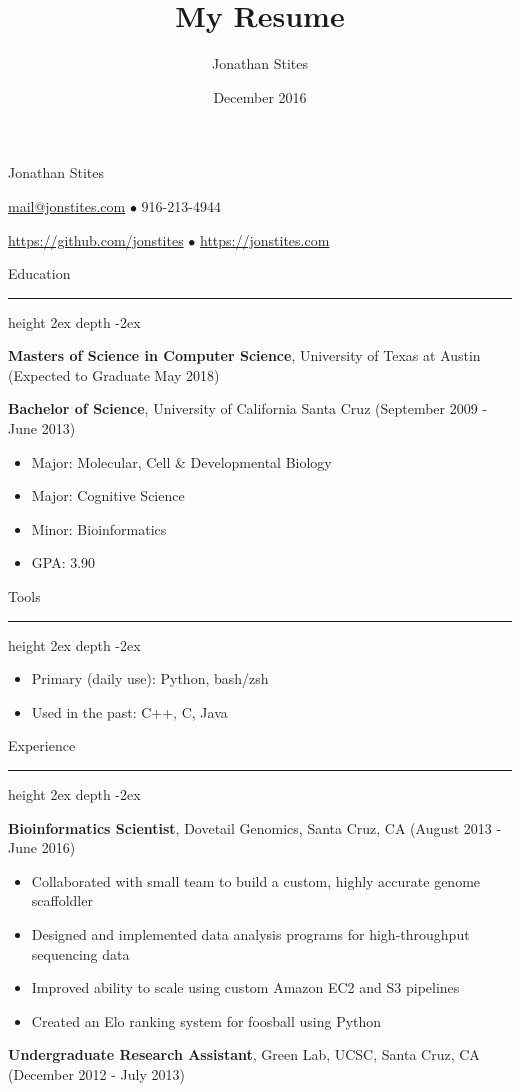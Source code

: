 \documentclass[10pt]{article}
\title{My Resume}
\author{Jonathan Stites}
\date{December 2016}
\newcommand\sectionline{\par\leavevmode\leaders\hrule height 2ex depth \dimexpr0.4pt-2ex\hfill\kern0pt\par}
\begin{document}
\begin{center}
{\LARGE Jonathan Stites}

{\href{mailto:mail+resume@jonstites.com}{mail@jonstites.com}}
$\bullet$
916-213-4944

{\href{https://github.com/jonstites}{https://github.com/jonstites}}
$\bullet$
{\href{https://jonstites.com}{https://jonstites.com}}
\end{center}

{\Large Education}\sectionline

\textbf{Masters of Science in Computer Science}, University of Texas at Austin (Expected to Graduate May 2018)

\vspace{\baselineskip}

\textbf{Bachelor of Science}, University of California Santa Cruz (September 2009 - June 2013)

\begin{itemize}
\item Major: Molecular, Cell \& Developmental Biology
\item Major: Cognitive Science
\item Minor: Bioinformatics
\item GPA: 3.90
\end{itemize}

{\Large Tools}\sectionline

\begin{itemize}
\item Primary (daily use): Python, bash/zsh
\item Used in the past: C++, C, Java
\end{itemize}

{\Large Experience}\sectionline

\textbf{Bioinformatics Scientist}, Dovetail Genomics, Santa Cruz, CA (August 2013 - June 2016)

\begin{itemize}
\item Collaborated with small team to build a custom, highly accurate genome scaffoldler
\item Designed and implemented data analysis programs for high-throughput sequencing data
\item Improved ability to scale using custom Amazon EC2 and S3 pipelines
\item Created an Elo ranking system for foosball using Python
\end{itemize}

\textbf{Undergraduate Research Assistant}, Green Lab, UCSC, Santa Cruz, CA (December 2012 - July 2013)
\end{document}

